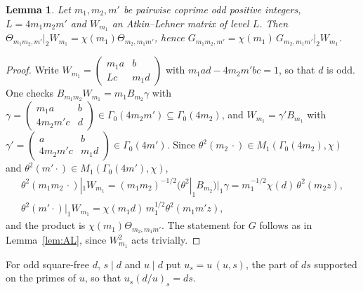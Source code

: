 ﻿\documentclass[11pt]{amsart}
\newtheorem{lemma}[theorem]{Lemma}
\theoremstyle{remark}
\begin{document}
\begin{lemma}\label{lem:transport}
Let $m_1,m_2,m'$ be pairwise coprime odd positive integers, $L=4m_1m_2m'$ and $W_{m_1}$ an Atkin--Lehner matrix of level $L$. Then $\Theta_{m_1m_2,m'}|_2W_{m_1}=\chi(m_1)\Theta_{m_2,m_1m'}$, hence $G_{m_1m_2,m'}=\chi(m_1)\,G_{m_2,m_1m'}|_2W_{m_1}$.
\end{lemma}
\begin{proof}
Write $W_{m_1}=\left(\begin{smallmatrix}m_1a&b\\Lc&m_1d\end{smallmatrix}\right)$ with $m_1ad-4m_2m'bc=1$, so that $d$ is odd. One checks $B_{m_1m_2}W_{m_1}=m_1B_{m_2}\gamma$ with $\gamma=\left(\begin{smallmatrix}m_1a&b\\4m_2m'c&d\end{smallmatrix}\right)\in\Gamma_0(4m_2m')\subseteq\Gamma_0(4m_2)$, and $W_{m_1}=\gamma'B_{m_1}$ with $\gamma'=\left(\begin{smallmatrix}a&b\\4m_2m'c&m_1d\end{smallmatrix}\right)\in\Gamma_0(4m')$. Since $\theta^2(m_2\,\cdot)\in M_1(\Gamma_0(4m_2),\chi)$ and $\theta^2(m'\cdot)\in M_1(\Gamma_0(4m'),\chi)$,
\begin{gather*}
\theta^2(m_1m_2\,\cdot)|_1W_{m_1}=(m_1m_2)^{-1/2}\bigl(\theta^2|_1B_{m_2}\bigr)|_1\gamma=m_1^{-1/2}\chi(d)\,\theta^2(m_2z),\\
\theta^2(m'\cdot)|_1W_{m_1}=\chi(m_1d)\,m_1^{1/2}\theta^2(m_1m'z),
\end{gather*}
and the product is $\chi(m_1)\Theta_{m_2,m_1m'}$. The statement for $G$ follows as in Lemma~\ref{lem:AL}, since $W_{m_1}^2$ acts trivially.
\end{proof}

For odd square-free $d$, $s\mid d$ and $u\mid d$ put $u_s=u\,(u,s)$, the part of $ds$ supported on the primes of $u$, so that $u_s(d/u)_s=ds$.
\end{document}
